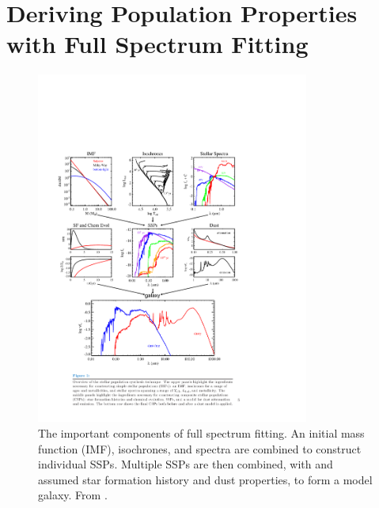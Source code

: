 \section{Deriving Population Properties with Full Spectrum Fitting}
\label{intro:sec:SSP}
\begin{figure}
  \centering
  \includegraphics[width=0.8\textwidth]{Introduction/figs/conroy_13.pdf}
  \caption[Schematic of full spectrum
  fitting]{\fixspacing\label{intro:fig:conroy}The important components
    of full spectrum fitting. An initial mass function (IMF),
    isochrones, and spectra are combined to construct individual
    SSPs. Multiple SSPs are then combined, with and assumed star
    formation history and dust properties, to form a model
    galaxy. From \citet{Conroy13}.}
\end{figure}

